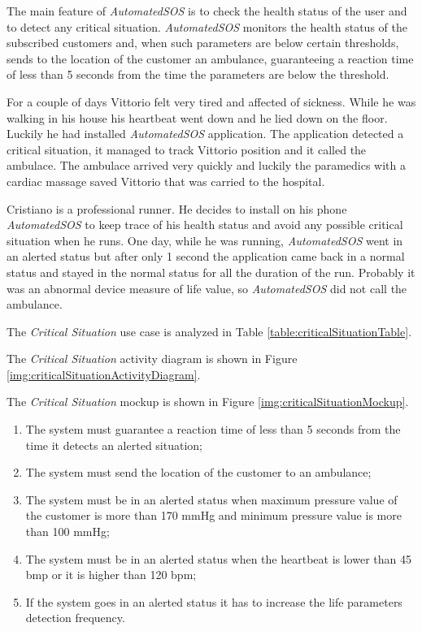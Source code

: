 The main feature of \textit{AutomatedSOS} is to check the health status of the user and to detect any critical situation.
\textit{AutomatedSOS} monitors the health status of the subscribed customers and, when such parameters are below certain thresholds, sends to the location of the customer an ambulance, guaranteeing a reaction time of less than 5 seconds from the time the parameters are below the threshold.

For a couple of days Vittorio felt very tired and affected of sickness. While he was walking in his house his heartbeat went down and he lied down on the floor. Luckily he had installed \textit{AutomatedSOS} application.
The application detected a critical situation, it managed to track Vittorio position and it called the ambulace.
The ambulace arrived very quickly and luckily the paramedics with a cardiac massage saved Vittorio that was carried to the hospital.

Cristiano is a professional runner. He decides to install on his phone \textit{AutomatedSOS} to keep trace of his health status and avoid any possible critical situation when he runs.
One day, while he was running, \textit{AutomatedSOS} went in an alerted status but after only 1 second the application came back in a normal status and stayed in the normal status for all the duration of the run.
Probably it was an abnormal device measure of life value, so \textit{AutomatedSOS} did not call the ambulance.

The \textit{Critical Situation} use case is analyzed in Table \ref{table:criticalSituationTable}.

The \textit{Critical Situation} activity diagram is shown in Figure \ref{img:criticalSituationActivityDiagram}.

The \textit{Critical Situation} mockup is shown in Figure \ref{img:criticalSituationMockup}.
\clearpage

\begin{enumerate}
  \item The system must guarantee a reaction time of less than 5 seconds from the time it detects an alerted situation;
  \item The system must send the location of the customer to an ambulance;
  \item The system must be in an alerted status when maximum pressure value of the customer is more than 170 mmHg and minimum pressure value is more than 100 mmHg;
  \item The system must be in an alerted status when the heartbeat is lower than 45 bmp or it is higher than 120 bpm;
  \item If the system goes in an alerted status it has to increase the life parameters detection frequency.
\end{enumerate}

